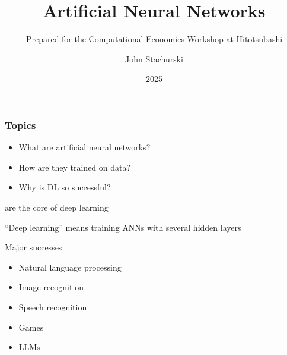 


\title{Artificial Neural Networks}
\subtitle{Prepared for the Computational Economics Workshop at Hitotsubashi}

\author{John Stachurski}


\date{2025}




\begin{frame}
  \titlepage
\end{frame}



\begin{frame}
    \frametitle{Topics}

    \begin{itemize}
        \item What are artificial neural networks?
        \vspace{0.5em}
        \item How are they trained on data?
        \vspace{0.5em}
        \item Why is DL so successful?
        \vspace{0.5em}
    \end{itemize}

\end{frame}


\begin{frame}
    
     are the core of deep learning

        \vspace{0.5em}
    ``Deep learning'' means training ANNs with several hidden layers

        \vspace{0.5em}
    Major successes:
    \begin{itemize}
        \item Natural language processing
        \vspace{0.3em}
        \item Image recognition
        \vspace{0.3em}
        \item Speech recognition
        \vspace{0.3em}
        \item Games
        \vspace{0.3em}
        \item LLMs
    \end{itemize}

\end{frame}

